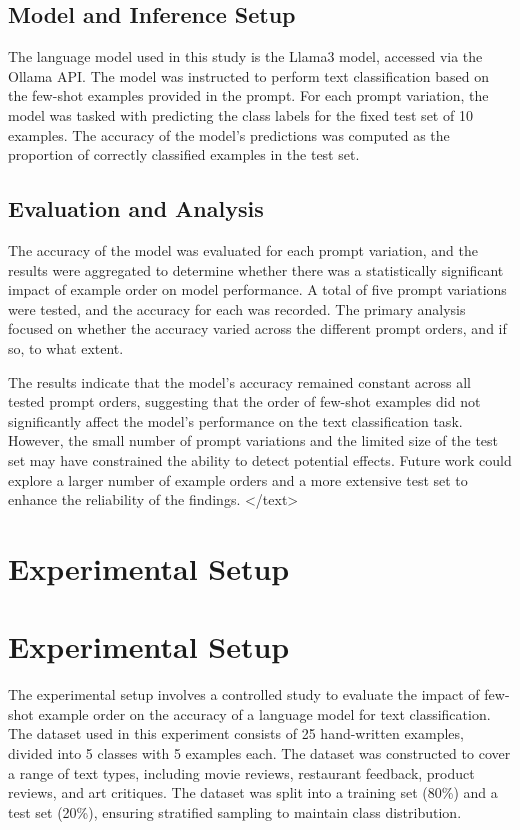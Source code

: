 \documentclass{article}
\begin{document}
\subsection*{Model and Inference Setup}

The language model used in this study is the Llama3 model, accessed via the Ollama API. The model was instructed to perform text classification based on the few-shot examples provided in the prompt. For each prompt variation, the model was tasked with predicting the class labels for the fixed test set of 10 examples. The accuracy of the model's predictions was computed as the proportion of correctly classified examples in the test set.

\subsection*{Evaluation and Analysis}

The accuracy of the model was evaluated for each prompt variation, and the results were aggregated to determine whether there was a statistically significant impact of example order on model performance. A total of five prompt variations were tested, and the accuracy for each was recorded. The primary analysis focused on whether the accuracy varied across the different prompt orders, and if so, to what extent.

The results indicate that the model's accuracy remained constant across all tested prompt orders, suggesting that the order of few-shot examples did not significantly affect the model's performance on the text classification task. However, the small number of prompt variations and the limited size of the test set may have constrained the ability to detect potential effects. Future work could explore a larger number of example orders and a more extensive test set to enhance the reliability of the findings.
</text>
\section{Experimental Setup}
\section*{Experimental Setup}

The experimental setup involves a controlled study to evaluate the impact of few-shot example order on the accuracy of a language model for text classification. The dataset used in this experiment consists of 25 hand-written examples, divided into 5 classes with 5 examples each. The dataset was constructed to cover a range of text types, including movie reviews, restaurant feedback, product reviews, and art critiques. The dataset was split into a training set (80\%) and a test set (20\%), ensuring stratified sampling to maintain class distribution.
\end{document}
